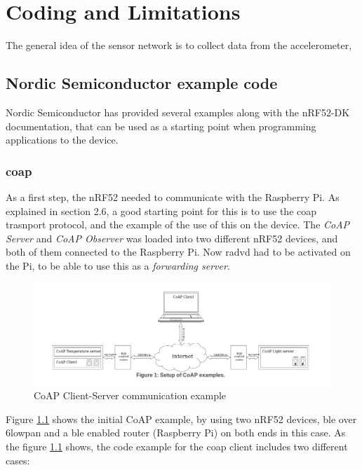 \chapter{Coding and Limitations} %
\label{chp:measurements}

The general idea of the sensor network is to collect data from the accelerometer,

\section{Nordic Semiconductor example code}

Nordic Semiconductor has provided several examples along with the nRF52-DK documentation, that can be used as a starting point when programming applications to the device. 

\subsection{\gls{coap}}

As a first step, the nRF52 needed to communicate with the Raspberry Pi. As explained in section 2.6, a good starting point for this is to use the \gls{coap} trasnport protocol, and the example of the use of this on the device. The \textit{CoAP Server} and \textit{CoAP Observer} was loaded into two different nRF52 devices, and both of them connected to the Raspberry Pi. Now \gls{radvd} had to be activated on the Pi, to be able to use this as a \textit{forwarding server}. 

\begin{figure}[h]
    \centering
    \includegraphics[scale=0.47]{CoAPExample.png}    
    \caption{CoAP Client-Server communication example}
    \label{fig:CoAPexample1}
\end{figure}

Figure \ref{fig:CoAPexample1} shows the initial CoAP example, by using two nRF52 devices, \gls{ble} over \gls{6lowpan} and a \gls{ble} enabled router (Raspberry Pi) on both ends in this case. As the figure \ref{fig:CoAPexample1} shows, the code example for the \gls{coap} client includes two different cases: 

